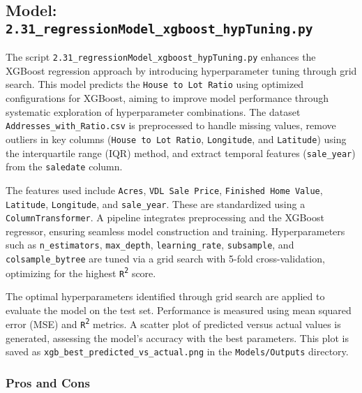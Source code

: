 \hrulefill

\subsection{Model: \texttt{2.31\_regressionModel\_xgboost\_hypTuning.py}}

The script \texttt{2.31\_regressionModel\_xgboost\_hypTuning.py} enhances the XGBoost regression approach by introducing hyperparameter tuning through grid search. This model predicts the \texttt{House to Lot Ratio} using optimized configurations for XGBoost, aiming to improve model performance through systematic exploration of hyperparameter combinations. The dataset \texttt{Addresses\_with\_Ratio.csv} is preprocessed to handle missing values, remove outliers in key columns (\texttt{House to Lot Ratio}, \texttt{Longitude}, and \texttt{Latitude}) using the interquartile range (IQR) method, and extract temporal features (\texttt{sale\_year}) from the \texttt{saledate} column.

The features used include \texttt{Acres}, \texttt{VDL Sale Price}, \texttt{Finished Home Value}, \texttt{Latitude}, \texttt{Longitude}, and \texttt{sale\_year}. These are standardized using a \texttt{ColumnTransformer}. A pipeline integrates preprocessing and the XGBoost regressor, ensuring seamless model construction and training. Hyperparameters such as \texttt{n\_estimators}, \texttt{max\_depth}, \texttt{learning\_rate}, \texttt{subsample}, and \texttt{colsample\_bytree} are tuned via a grid search with 5-fold cross-validation, optimizing for the highest \texttt{R\textsuperscript{2}} score.

The optimal hyperparameters identified through grid search are applied to evaluate the model on the test set. Performance is measured using mean squared error (MSE) and \texttt{R\textsuperscript{2}} metrics. A scatter plot of predicted versus actual values is generated, assessing the model’s accuracy with the best parameters. This plot is saved as \texttt{xgb\_best\_predicted\_vs\_actual.png} in the \texttt{Models/Outputs} directory.

\subsubsection*{Pros and Cons}

